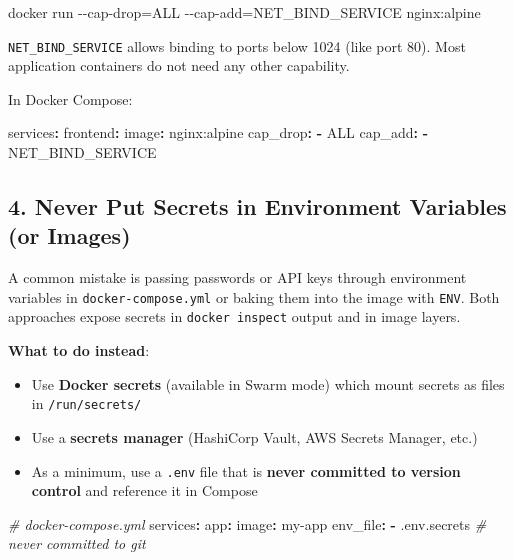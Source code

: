 \documentclass[11pt,american,a4paper,openany]{book}
\providecommand{\tightlist}{%
  \setlength{\itemsep}{2pt}\setlength{\parskip}{0pt}}
\newenvironment{Shaded}{}{}
\newcommand{\AttributeTok}[1]{\textcolor[rgb]{0.49,0.56,0.16}{#1}}
\newcommand{\CommentTok}[1]{\textcolor[rgb]{0.38,0.63,0.69}{\textit{#1}}}
\newcommand{\FunctionTok}[1]{\textcolor[rgb]{0.02,0.16,0.49}{#1}}
\newcommand{\KeywordTok}[1]{\textcolor[rgb]{0.00,0.44,0.13}{\textbf{#1}}}
\newcommand{\NormalTok}[1]{#1}
\begin{document}
\begin{Shaded}
\begin{Highlighting}[]
\NormalTok{docker run {-}{-}cap{-}drop=ALL {-}{-}cap{-}add=NET\_BIND\_SERVICE nginx:alpine}
\end{Highlighting}
\end{Shaded}

\texttt{NET\_BIND\_SERVICE} allows binding to ports below 1024 (like
port 80). Most application containers do not need any other capability.

In Docker Compose:

\begin{Shaded}
\begin{Highlighting}[]
\FunctionTok{services}\KeywordTok{:}
\AttributeTok{  }\FunctionTok{frontend}\KeywordTok{:}
\AttributeTok{    }\FunctionTok{image}\KeywordTok{:}\AttributeTok{ nginx:alpine}
\AttributeTok{    }\FunctionTok{cap\_drop}\KeywordTok{:}
\AttributeTok{      }\KeywordTok{{-}}\AttributeTok{ ALL}
\AttributeTok{    }\FunctionTok{cap\_add}\KeywordTok{:}
\AttributeTok{      }\KeywordTok{{-}}\AttributeTok{ NET\_BIND\_SERVICE}
\end{Highlighting}
\end{Shaded}

\subsection{4. Never Put Secrets in Environment Variables (or
Images)}\label{never-put-secrets-in-environment-variables-or-images}

A common mistake is passing passwords or API keys through environment
variables in \texttt{docker-compose.yml} or baking them into the image
with \texttt{ENV}. Both approaches expose secrets in
\texttt{docker\ inspect} output and in image layers.

\textbf{What to do instead}:

\begin{itemize}
\tightlist
\item
  Use \textbf{Docker secrets} (available in Swarm mode) which mount
  secrets as files in \texttt{/run/secrets/}
\item
  Use a \textbf{secrets manager} (HashiCorp Vault, AWS Secrets Manager,
  etc.)
\item
  As a minimum, use a \texttt{.env} file that is \textbf{never committed
  to version control} and reference it in Compose
\end{itemize}

\begin{Shaded}
\begin{Highlighting}[]
\CommentTok{\# docker{-}compose.yml}
\FunctionTok{services}\KeywordTok{:}
\AttributeTok{  }\FunctionTok{app}\KeywordTok{:}
\AttributeTok{    }\FunctionTok{image}\KeywordTok{:}\AttributeTok{ my{-}app}
\AttributeTok{    }\FunctionTok{env\_file}\KeywordTok{:}
\AttributeTok{      }\KeywordTok{{-}}\AttributeTok{ .env.secrets}\CommentTok{   \# never committed to git}
\end{Highlighting}
\end{Shaded}
\end{document}

